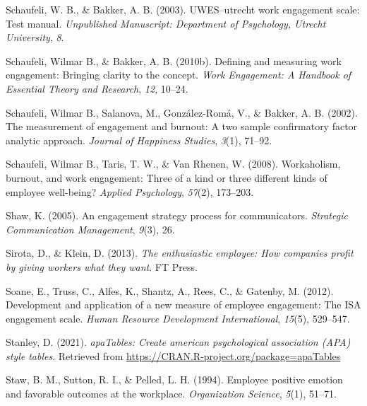 \documentclass[
  man]{apa7}
\newlength{\cslhangindent}
\newlength{\cslentryspacingunit} %
\newenvironment{CSLReferences}[2] %
 {%
  \setlength{\parindent}{0pt}
  \ifodd #1
  \let\oldpar\par
  \def\par{\hangindent=\cslhangindent\oldpar}
  \fi
  \setlength{\parskip}{#2\cslentryspacingunit}
 }%
 {}
\begin{document}
\begin{CSLReferences}{1}{0}
\leavevmode{}%
Schaufeli, W. B., \& Bakker, A. B. (2003). {UWES}--utrecht work engagement scale: Test manual. \emph{Unpublished Manuscript: Department of Psychology, Utrecht University}, \emph{8}.

\leavevmode{}%
Schaufeli, Wilmar B., \& Bakker, A. B. (2010b). Defining and measuring work engagement: Bringing clarity to the concept. \emph{Work Engagement: A Handbook of Essential Theory and Research}, \emph{12}, 10--24.

\leavevmode{}%
Schaufeli, Wilmar B., Salanova, M., González-Romá, V., \& Bakker, A. B. (2002). The measurement of engagement and burnout: A two sample confirmatory factor analytic approach. \emph{Journal of Happiness Studies}, \emph{3}(1), 71--92.

\leavevmode{}%
Schaufeli, Wilmar B., Taris, T. W., \& Van Rhenen, W. (2008). Workaholism, burnout, and work engagement: Three of a kind or three different kinds of employee well-being? \emph{Applied Psychology}, \emph{57}(2), 173--203.

\leavevmode{}%
Shaw, K. (2005). An engagement strategy process for communicators. \emph{Strategic Communication Management}, \emph{9}(3), 26.

\leavevmode{}%
Sirota, D., \& Klein, D. (2013). \emph{The enthusiastic employee: How companies profit by giving workers what they want}. FT Press.

\leavevmode{}%
Soane, E., Truss, C., Alfes, K., Shantz, A., Rees, C., \& Gatenby, M. (2012). Development and application of a new measure of employee engagement: The ISA engagement scale. \emph{Human Resource Development International}, \emph{15}(5), 529--547.

\leavevmode{}%
Stanley, D. (2021). \emph{apaTables: Create american psychological association (APA) style tables}. Retrieved from \url{https://CRAN.R-project.org/package=apaTables}

\leavevmode{}%
Staw, B. M., Sutton, R. I., \& Pelled, L. H. (1994). Employee positive emotion and favorable outcomes at the workplace. \emph{Organization Science}, \emph{5}(1), 51--71.


\end{CSLReferences}
\end{document}
